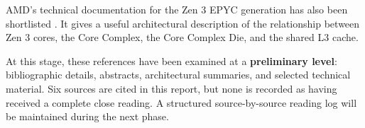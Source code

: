 AMD's technical documentation for the Zen 3 EPYC generation has also been shortlisted \cite{amd2022epyc7003}. It gives a useful architectural description of the relationship between Zen 3 cores, the Core Complex, the Core Complex Die, and the shared L3 cache.

At this stage, these references have been examined at a \textbf{preliminary level}: bibliographic details, abstracts, architectural summaries, and selected technical material. Six sources are cited in this report, but none is recorded as having received a complete close reading. A structured source-by-source reading log will be maintained during the next phase.
